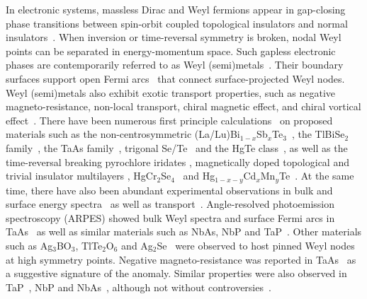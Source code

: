 In electronic systems, massless Dirac and Weyl fermions appear in gap-closing phase transitions between spin-orbit coupled topological insulators and normal insulators~\cite{Murakami2007}. When inversion or time-reversal symmetry is broken, nodal Weyl points can be separated in energy-momentum space. Such gapless electronic phases are contemporarily referred to as Weyl (semi)metals~\cite{WanVishwanathSavrasovPRB11,YangLuRan11,burkovBalenstPRL11,BurkovBalentsPRB11}. Their boundary surfaces support open Fermi arcs~\cite{WanVishwanathSavrasovPRB11} that connect surface-projected Weyl nodes. Weyl (semi)metals also exhibit exotic transport properties, such as negative magneto-resistance, non-local transport, chiral magnetic effect, and chiral vortical effect~\cite{Burkov_Weyl_electromagnetic_2012,Hosur_Weyl_develop,Lu_anomaly_Weyl_2013,SonSpivak13,Sid_anomaly_Weyl,Marcel_Weyl_response}. There have been numerous first principle calculations~\cite{WengXiZhong16} on proposed materials such as the non-centrosymmetric (La/Lu)Bi$_{1-x}$Sb$_x$Te$_3$~\cite{LiuVanderbilt14}, the TlBiSe$_2$ family~\cite{SinghSharmaLinHasanPrasadBansil12}, the TaAs family~\cite{WengBernevigDai2015,HuangXuZahidTaAs2015}, trigonal Se/Te~\cite{HirayamaOkugawaIshibashiMurakamiMiyake15} and the HgTe class~\cite{RuanXing16}, as well as the time-reversal breaking pyrochlore iridates \cite{WanVishwanathSavrasovPRB11,witczak_kim_weyl_2012,chen_hermele_weyl}, magnetically doped topological and trivial insulator multilayers \cite{burkovBalenstPRL11}, HgCr$_2$Se$_4$~\cite{XuWengWangDaiFang11} and Hg$_{1-x-y}$Cd$_x$Mn$_y$Te~\cite{BulmashLiuQi14}. At the same time, there have also been abundant experimental observations in bulk and surface energy spectra~\cite{HasanXuBelopolskiHuang17} as well as transport~\cite{WangLinWangYuLiao17}. Angle-resolved photoemission spectroscopy (\hypertarget{ARPES}{ARPES}) showed bulk Weyl spectra and surface Fermi arcs in TaAs~\cite{Xu_Weyl_2015_first,Weyl_discovery_TaAs,YangLiuChenTaAs2015,TaAs_Weyl_obeservationDing,BelopolskiZahid16} as well as similar materials such as NbAs, NbP and TaP~\cite{XuNbAs15,LiuChen16}. Other materials such as Ag$_3$BO$_3$, TlTe$_2$O$_6$ and Ag$_2$Se~\cite{ChangHasan16} were observed to host pinned Weyl nodes at high symmetry points. %
Negative magneto-resistance was reported in TaAs~\cite{Huang_Weyl_2015,Zhang_anomaly_Weyl_2015} as a suggestive signature of the \ABJ anomaly. Similar properties were also observed in TaP~\cite{HuMaoTaP17}, NbP and NbAs~\cite{CorinnaNiemannFelserNbP17,LiXuNbAsNbP17,GoothNielschNbP17}, although not without controversies~\cite{SudeshPatnaikNbP17}. 

